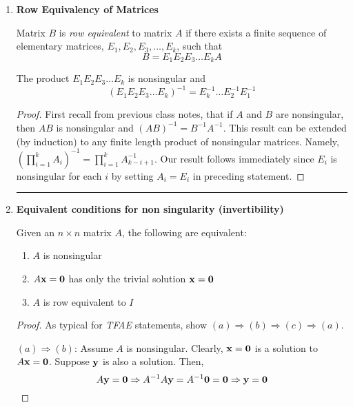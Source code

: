 \begin{enumerate}
\rule[0.01in]{\textwidth}{0.0025in}





\item \textbf{Row Equivalency of Matrices}  
\begin{definition}
Matrix $B$ is \textit{row equivalent} to matrix $A$ if there exists a finite sequence  of elementary matrices, $E_1, E_2, E_3, \dots, E_k$,  such that
\[ B =  E_1	E_2		E_3 	 	\dots		 E_k		 A \]
\end{definition}


\begin{theorem}
The product $E_1	E_2		E_3 	 	\dots		 E_k	$ is nonsingular and
\[ (E_1	E_2		E_3 	 	\dots		 E_k	)^{-1} = E_k^{-1} \dots E_2^{-1} E_1^{-1}  \]
	\begin{proof}
 First recall from previous class notes, that if $A$ and $B$ are nonsingular, then $AB$ is nonsingular and $(AB)^{-1} = B^{-1}A^{-1}$.  This result can be extended (by induction) to any finite length product of nonsingular matrices.  Namely, $\left( \prod \limits_{i=1}^{k} A_i \right)^{-1} =  \prod \limits_{i=1}^{k} A_{k-i+1}^{-1}$.  Our result follows immediately since $E_i$ is nonsingular for each $i$ by setting $A_i=E_i$ in preceding statement. 
	\end{proof}

\end{theorem}
\rule[0.01in]{\textwidth}{0.0025in}



\item \textbf{Equivalent conditions for non singularity (invertibility)}
\begin{theorem}
	Given an $n \times n$ matrix $A$, the following are equivalent:
	\begin{enumerate}
		\item $A$ is nonsingular
		\item $A {\bf x} = {\bf 0}$ has only the trivial solution ${\bf x} = {\bf 0}$
		\item $A$ is row equivalent to $I$
	\end{enumerate}
	
	\begin{proof}
		As typical for \textit{TFAE} statements, show $(a) \Rightarrow (b) \Rightarrow (c) \Rightarrow (a)$.  
		
		$(a) \Rightarrow (b)$:  Assume $A$ is nonsingular.  Clearly,    ${\bf x} = {\bf 0}$ is a solution to $A {\bf x} = {\bf 0}$.  Suppose ${\bf y}$ is also a solution.  Then, 
		\[  A {\bf y} = {\bf 0}  \Rightarrow A^{-1} A {\bf y} = A^{-1} {\bf 0} = {\bf 0}  \Rightarrow {\bf y} = {\bf 0} \]
		

\end{proof}
\end{theorem}
\end{enumerate}
